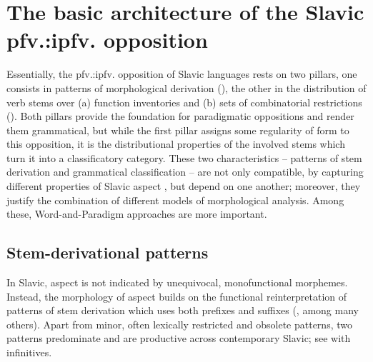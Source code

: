\documentclass[output=paper]{langscibook}
\begin{document}
\section{The basic architecture of the Slavic pfv.:ipfv. opposition} \label{wiemer:2}


Essentially, the pfv.:ipfv. opposition of Slavic languages rests on two pillars, one consists in patterns of morphological derivation (), the other in the distribution of verb stems over (a) function inventories and (b) sets of combinatorial restrictions (). Both pillars provide the foundation for paradigmatic oppositions and render them grammatical, but while the first pillar assigns some regularity of form to this opposition, it is the distributional properties of the involved stems which turn it into a classificatory category. These two characteristics – patterns of stem derivation and grammatical classification – are not only compatible, by capturing different properties of Slavic aspect \citep{Wiemer2006}, but depend on one another; moreover, they justify the combination of different models of morphological analysis. Among these, Word-and-Paradigm approaches are more important.

\subsection{Stem-derivational patterns} \label{wiemer:2.1}

In Slavic, aspect is not indicated by unequivocal, monofunctional morphemes. Instead, the morphology of aspect builds on the functional reinterpretation of patterns of stem derivation which uses both prefixes and suffixes (\citealt{Breu2000, Wiemer2008, WiemerSerzant2017}, among many others). Apart from minor, often lexically restricted and obsolete patterns, two patterns predominate and are productive across contemporary Slavic; see  with infinitives.
\end{document}
